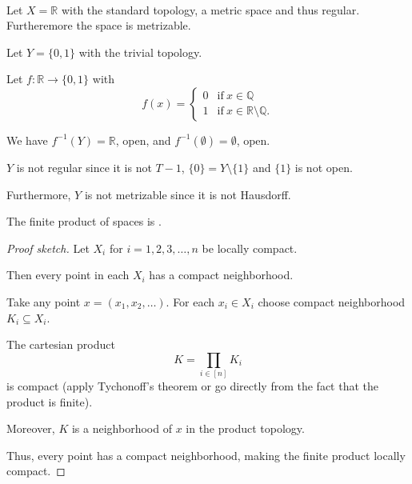 \documentclass[11pt]{article}
\begin{document}
\begin{ex}\label{ex:image_regular}
    \medskip 
    \ 
    

    Let $X = \mathbb R$ with the 
    standard topology, a metric space 
    and thus regular. Furtheremore the space is metrizable.

    Let $Y = \{0,1\}$ with the trivial topology. 

    Let $f : \mathbb R \to \{0,1\}$ with 
    \[
        f(x) = 
        \begin{cases}
            0 & \text{if} \ x \in \mathbb Q \\ 
            1 & \text{if} \ x \in \mathbb R \setminus 
            \mathbb Q. 
        \end{cases}
    \]

    We have $f^{-1}(Y) = \mathbb R$, open, and 
    $f^{-1}(\emptyset) = \emptyset$, open. 

    $Y$ is not regular since it is not $T-1$, 
    $\{0\} = Y \setminus \{1\}$ and $\{1\}$ is not 
    open. 

    Furthermore, $Y$ is not metrizable since it is not 
    Hausdorff.

\end{ex}

\begin{prop}\label{prop:product_local_compact}
    The finite product of  spaces
    is .
\end{prop}
\begin{proof}[Proof sketch]
    Let $X_i$ for $i = 1,2,3,\ldots,n$ be 
    locally compact. 

    Then every point in each $X_i$ has a compact 
    neighborhood. 

    Take any point $x = (x_1,x_2,\ldots)$. 
    For each $x_i \in X_i$ choose compact neighborhood 
    $K_i \subseteq X_i$. 

    The cartesian product 
    \[
        K = \prod_{i\in[n]} K_i 
    \]
    is compact (apply Tychonoff's theorem or 
    go directly from the fact that the product is 
    finite). 

    Moreover, $K$ is a neighborhood of $x$ in the 
    product topology. 

    Thus, every point has a compact neighborhood, making 
    the finite product locally compact. 
\end{proof}
\end{document}
